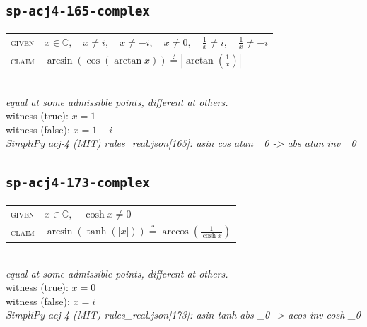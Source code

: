 \documentclass[11pt]{article}
\begin{document}
\subsection*{\texttt{sp-acj4-165-complex}}
\begin{tabular}{@{}l@{\quad}l@{}}
\textsc{given} & $x \in \mathbb{C},\quad x \neq i,\quad x \neq -i,\quad x \neq 0,\quad \frac{1}{x} \neq i,\quad \frac{1}{x} \neq -i$ \\[4pt]
\textsc{claim} & $\displaystyle \arcsin\left(\cos\left(\arctan x\right)\right) \overset{?}{=} \left|\arctan\left(\frac{1}{x}\right)\right|$ \\
\end{tabular}\\[2pt]
{\small\emph{equal at some admissible points, different at others.}}\\
{\footnotesize\color{gray}witness (true): $x = 1$}\\
{\footnotesize\color{gray}witness (false): $x = 1 + i$}\\
\emph{SimpliPy acj-4 (MIT) rules\_real.json[165]: asin cos atan \_0  ->  abs atan inv \_0}\\

\subsection*{\texttt{sp-acj4-173-complex}}
\begin{tabular}{@{}l@{\quad}l@{}}
\textsc{given} & $x \in \mathbb{C},\quad \cosh x \neq 0$ \\[4pt]
\textsc{claim} & $\displaystyle \arcsin\left(\tanh\left(\left|x\right|\right)\right) \overset{?}{=} \arccos\left(\frac{1}{\cosh x}\right)$ \\
\end{tabular}\\[2pt]
{\small\emph{equal at some admissible points, different at others.}}\\
{\footnotesize\color{gray}witness (true): $x = 0$}\\
{\footnotesize\color{gray}witness (false): $x = i$}\\
\emph{SimpliPy acj-4 (MIT) rules\_real.json[173]: asin tanh abs \_0  ->  acos inv cosh \_0}\\
\end{document}
